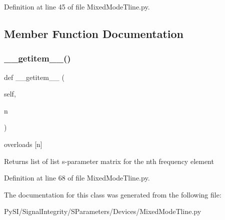 Definition at line 45 of file Mixed\+Mode\+Tline.\+py.



\subsection{Member Function Documentation}
\mbox{\label{classSignalIntegrity_1_1SParameters_1_1Devices_1_1MixedModeTline_1_1MixedModeTLine_ab7a6da5139e0878b590d68292aaa70f2}} 
\subsubsection{\texorpdfstring{\+\_\+\+\_\+getitem\+\_\+\+\_\+()}{\_\_getitem\_\_()}}
{\footnotesize\ttfamily def \+\_\+\+\_\+getitem\+\_\+\+\_\+ (\begin{DoxyParamCaption}\item[{}]{self,  }\item[{}]{n }\end{DoxyParamCaption})}



overloads \mbox{[}n\mbox{]} 

\begin{DoxyReturn}{Returns}
list of list s-\/parameter matrix for the nth frequency element 
\end{DoxyReturn}


Definition at line 68 of file Mixed\+Mode\+Tline.\+py.



The documentation for this class was generated from the following file\+:\begin{DoxyCompactItemize}
\item 
Py\+S\+I/\+Signal\+Integrity/\+S\+Parameters/\+Devices/Mixed\+Mode\+Tline.\+py\end{DoxyCompactItemize}
